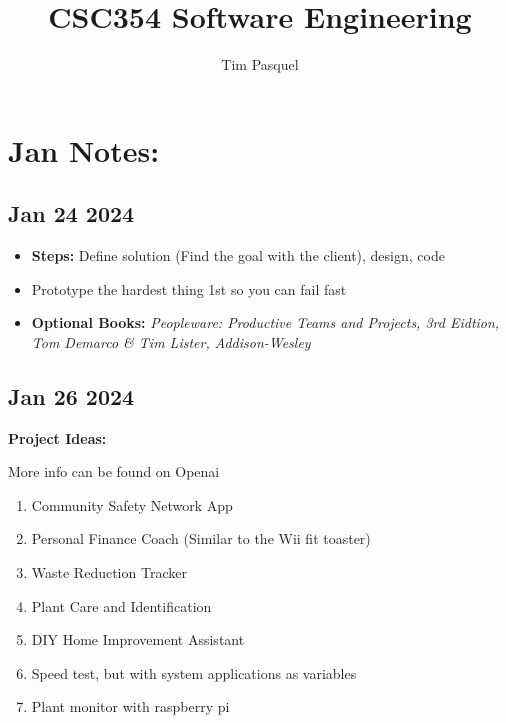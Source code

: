 \documentclass[12pt]{article}
\author{Tim Pasquel}
\title{CSC354 Software Engineering}
\begin{document}
\maketitle

\titlepage

\section{Jan Notes:}

\subsection{Jan 24 2024}

\begin{itemize}
		  \item \textbf{Steps:} Define solution (Find the goal with the client), design, code  
		  \item Prototype the hardest thing 1st so you can fail fast 
		  \item \textbf{Optional Books:} \it{Peopleware: Productive Teams and Projects, 3rd Eidtion, Tom Demarco \& Tim Lister, Addison-Wesley}
\end{itemize}

\subsection{Jan 26 2024}

\textbf{Project Ideas:}

More info can be found on Openai

\begin{enumerate}
		  \item Community Safety Network App
		  \item Personal Finance Coach (Similar to the Wii fit toaster) 
		  \item Waste Reduction Tracker
		  \item Plant Care and Identification 
		  \item DIY Home Improvement Assistant 
		  \item Speed test, but with system applications as variables 
		  \item Plant monitor with raspberry pi 
\end{enumerate}
\end{document}
